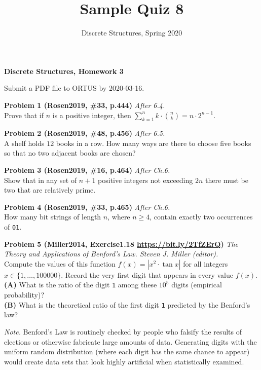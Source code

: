 \documentclass[jou]{apa6}
\title{Sample Quiz 8}
\author{Discrete Structures, Spring 2020}
\affiliation{RBS}
\begin{document}
\thispagestyle{empty}

\twocolumn
\begin{center}
{\large \bf Discrete Structures, Homework 3}
\end{center}


Submit a PDF file to ORTUS by 2020-03-16.

\vspace{4pt}
{\bf Problem 1 (Rosen2019, \#33, p.444)} \textendash{} {\em After 6.4.}\\
Prove that if $n$ is a positive integer, then 
${\displaystyle \sum\limits_{k=1}^n k \cdot{} {n \choose k} = n \cdot{} 2^{n-1}}$. 

\vspace{8pt}
{\bf Problem 2 (Rosen2019, \#48, p.456)} \textendash{} {\em After 6.5.}\\
A shelf holds $12$ books in a row. How many ways are there to choose five books so that no two adjacent books 
are chosen?

\vspace{8pt}
{\bf Problem 3 (Rosen2019, \#16, p.464)} \textendash{} {\em After Ch.6.}\\
Show that in any set of $n+1$ positive integers not exceeding $2n$ there must be two 
that are relatively prime.

\vspace{8pt}
{\bf Problem 4 (Rosen2019, \#33, p.465)} \textendash{} {\em After Ch.6.}\\
How many bit strings of length $n$, where $n \geq 4$, contain exactly two 
occurrences of {\tt 01}.

\vspace{8pt}
{\bf Problem 5 (Miller2014, Exercise1.18 \url{https://bit.ly/2TfZErQ})} {\em The Theory and Applications of 
Benford's Law. Steven J. Miller (editor).}\\
Compute the values of this function $f(x) = \left| x^2 \cdot \tan x \right|$ for 
all integers $x \in \{ 1,\ldots,100000 \}$. Record the very first digit that appears in every value $f(x)$.\\
{\bf (A)} What is the ratio of the digit {\tt 1} among these $10^5$ digits (empirical probability)?\\
{\bf (B)} What is the theoretical ratio of the first digit {\tt 1} predicted by the Benford's law? 

{\em Note.} Benford's Law is routinely checked by people who falsify the results of elections 
or otherwise fabricate large amounts of data. 
Generating digits with the uniform random distribution (where each 
digit has the same chance to appear) would create data sets that look highly artificial
when statistically examined.
\end{document}
